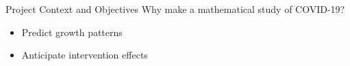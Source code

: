 \begin{slide}{Project Context and Objectives}
	{\large Why make a mathematical study of COVID-19?} \\
	
	\begin{itemize}
		\item Predict growth patterns
		\item Anticipate intervention effects
	\end{itemize}
\end{slide}